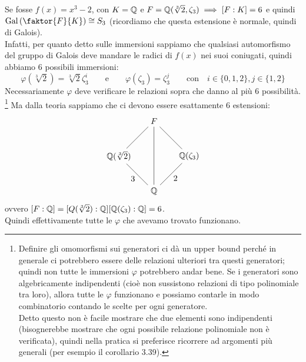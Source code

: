 \documentclass[11pt]{scrartcl}
\begin{document}
\begin{example}
    Se fosse $f(x) = x^3 - 2$, con $K = \mathbb Q$ e $F = \mathbb Q(\sqrt[3]{2},\zeta_3) \implies [F : K] = 6$ e quindi $\Gal\left(\faktor{F}{K}\right) \cong S_3$ (ricordiamo che questa estensione è normale, quindi di Galois). \\
    Infatti, per quanto detto sulle immersioni sappiamo che qualsiasi automorfismo del gruppo di Galois 
    deve mandare le radici di $f(x)$ nei suoi coniugati, quindi abbiamo 6 possibili immersioni:
    \[ \varphi(\sqrt[3]{2}) = \sqrt[3]{2}\zeta_3^i \qquad \text{e} \qquad \varphi(\zeta_3) = \zeta_3^j \qquad \text{con}\quad i \in \{0,1,2\},j \in \{1,2\}
        \]
    Necessariamente $\varphi$ deve verificare le relazioni sopra che danno al più 6 possibilità. 
    \footnote{Definire gli omomorfismi sui generatori ci dà un upper bound perché in generale ci potrebbero essere delle relazioni ulteriori tra questi generatori;
    quindi non tutte le immersioni $\varphi$ potrebbero andar bene. 
    Se i generatori sono algebricamente indipendenti (cioè non sussistono relazioni di tipo polinomiale tra loro), 
    allora tutte le $\varphi$ funzionano e possiamo contarle in modo combinatorio contando le scelte per ogni generatore. \\
    Detto questo non è facile mostrare che due elementi sono indipendenti (bisognerebbe mostrare che ogni possibile relazione polinomiale non è verificata), 
    quindi nella pratica si preferisce ricorrere ad argomenti più generali (per esempio il corollario 3.39).}
    Ma dalla teoria sappiamo che ci devono essere esattamente 6 estensioni:
    \[ \begin{tikzpicture}
        \node (Q1) at (0,0) {$\QQ$};
        \node (Q2) at (1.5,1.5) {$\QQ(\zeta_3)$};
        \node (Q3) at (0,3) {$F$};
        \node (Q4) at (-1.5,1.5) {$\QQ(\sqrt[3]2)$};
        \draw (Q1)--(Q2) node [pos=0.7, below,inner sep=0.25cm] {2};
        \draw (Q1)--(Q4) node [pos=0.7, below,inner sep=0.25cm] {3};
        \draw (Q3)--(Q4) node [pos=0.7, above]{};
        \draw (Q2)--(Q3) node [pos=0.3, above]{};
        \draw (Q1)--(Q3) node [pos=0.7, below, right,inner sep=0.25cm, yshift=-0.4cm]{};
        \end{tikzpicture}
    \]
    ovvero $[F : \mathbb Q] = [Q (\sqrt[3]{2}) : \mathbb Q][\mathbb Q(\zeta_3) : \mathbb Q] = 6$. \\
    Quindi effettivamente tutte le $\varphi$ che avevamo trovato funzionano.
\end{example}
\end{document}
